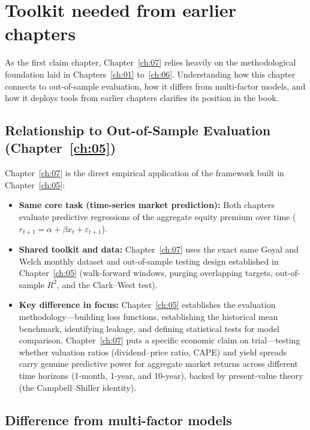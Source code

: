 \section{Toolkit needed from earlier chapters}
\label{sec:07-connection}

As the first claim chapter, Chapter~\ref{ch:07} relies heavily on the methodological foundation laid in Chapters~\ref{ch:01} to~\ref{ch:06}. Understanding how this chapter connects to out-of-sample evaluation, how it differs from multi-factor models, and how it deploys tools from earlier chapters clarifies its position in the book.

\subsection{Relationship to Out-of-Sample Evaluation (Chapter~\ref{ch:05})}

Chapter~\ref{ch:07} is the direct empirical application of the framework built in Chapter~\ref{ch:05}:

\begin{itemize}
  \item \textbf{Same core task (time-series market prediction):} Both chapters evaluate predictive regressions of the aggregate equity premium over time ($r_{t+1} = \alpha + \beta x_t + \varepsilon_{t+1}$).
  \item \textbf{Shared toolkit and data:} Chapter~\ref{ch:07} uses the exact same Goyal and Welch monthly dataset and out-of-sample testing design established in Chapter~\ref{ch:05} (walk-forward windows, purging overlapping targets, out-of-sample $R^2$, and the Clark--West test).
  \item \textbf{Key difference in focus:} Chapter~\ref{ch:05} establishes the evaluation methodology---building loss functions, establishing the historical mean benchmark, identifying leakage, and defining statistical tests for model comparison. Chapter~\ref{ch:07} puts a specific economic claim on trial---testing whether valuation ratios (dividend--price ratio, CAPE) and yield spreads carry genuine predictive power for aggregate market returns across different time horizons (1-month, 1-year, and 10-year), backed by present-value theory (the Campbell--Shiller identity).
\end{itemize}

\subsection{Difference from multi-factor models}

